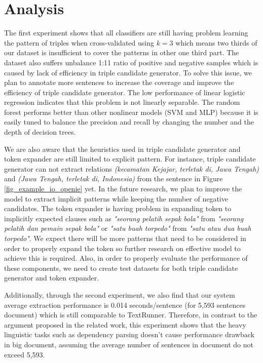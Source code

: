 \documentclass[conference,compsoc,12pt]{IEEEtran}
\begin{document}
\section{Analysis}

The first experiment shows that all classifiers are still having problem learning the pattern of triples when cross-validated using $k=3$ which means two thirds of our dataset is insufficient to cover the patterns in other one third part. The dataset also suffers unbalance 1:11 ratio of positive and negative samples which is caused by lack of efficiency in triple candidate generator. To solve this issue, we plan to annotate more sentences to increase the coverage and improve the efficiency of triple candidate generator. The low performance of linear logistic regression indicates that this problem is not linearly separable. The random forest performs better than other nonlinear models (SVM and MLP) because it is easily tuned to balance the precision and recall by changing the number and the depth of decision trees.

We are also aware that the heuristics used in triple candidate generator and token expander are still limited to explicit pattern. For instance, triple candidate generator can not extract relations \textit{(kecamatan Kejajar, terletak di, Jawa Tengah)} and \textit{(Jawa Tengah, terletak di, Indonesia)} from the sentence in Figure \ref{fig_example_io_openie} yet. In the future research, we plan to improve the model to extract implicit patterns while keeping the number of negative candidates. The token expander is having problem in expanding token to implicitly expected clauses such as \textit{"seorang pelatih sepak bola"} from \textit{"seorang pelatih dan pemain sepak bola"} or \textit{"satu buah torpedo"} from \textit{"satu atau dua buah torpedo"}. We expect there will be more patterns that need to be considered in order to properly expand the token so further research on effective model to achieve this is required. Also, in order to properly evaluate the performance of these components, we need to create test datasets for both triple candidate generator and token expander.

Additionally, through the second experiment, we also find that our system average extraction performance is 0.014 seconds/sentence (for 5,593 sentences document) which is still comparable to TextRunner\cite{banko2007open}. Therefore, in contrast to the argument proposed in the related work\cite{banko2007open}\cite{etzioni2011open}, this experiment shows that the heavy linguistic tasks such as dependency parsing doesn't cause performance drawback in big document, assuming the average number of sentences in document do not exceed 5,593.
\end{document}
